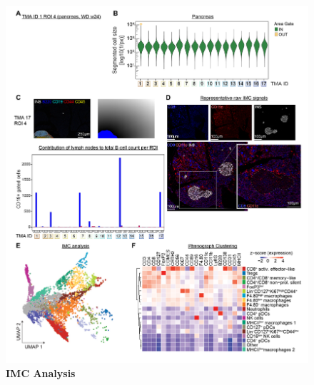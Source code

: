 \begin{figure}[htbp]
\centering
\includegraphics[width=\linewidth]{Chapter4/Fig/F2-2-01.png}
\caption[res-imc]{\textbf{IMC Analysis}}
\label{fig2-2}
\end{figure}

